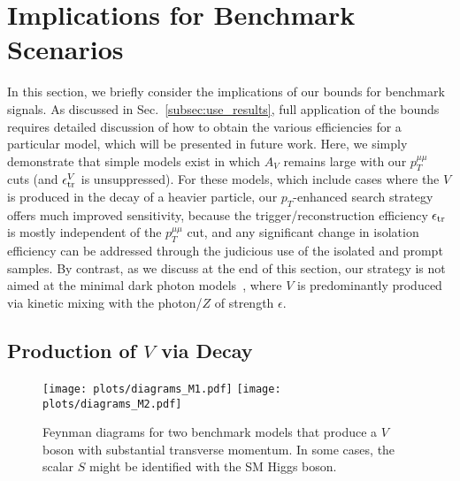 \documentclass[aps,prd,twocolumn,superscriptaddress,preprintnumbers,nofootinbib,longbibliography,floatfix]{revtex4-1}
\newcommand{\nameofsearch}{$p_T$-enhanced }
\newcommand{\ptmm}{p_T^{\mu\mu}}
\DeclareRobustCommand{\Sec}[1]{Sec.~\ref{#1}}
\begin{document}
\section{Implications for Benchmark Scenarios}
\label{sec:app}





In this section, we briefly consider the implications of our bounds for benchmark signals.  
%
As discussed in \Sec{subsec:use_results}, full application of the bounds requires detailed discussion of how to obtain the various efficiencies for a particular model, which will be presented in future work.
%
Here, we simply demonstrate that simple models exist in which $A_V$ remains large with our $\ptmm$ cuts (and $\epsilon^V_{\rm tr}$ is unsuppressed).
%
For these models, which include cases where the $V$ is produced in the decay of a heavier particle,
our \nameofsearch search strategy offers much improved sensitivity, because the trigger/reconstruction efficiency $\epsilon_{\rm tr}$ is mostly independent of the $\ptmm$ cut, and any significant change in isolation efficiency can be addressed through the judicious use of the isolated and prompt samples.
%
By contrast, as we discuss at the end of this section, our strategy is not aimed at the minimal dark photon models~\cite{Okun:1982xi,Galison:1983pa,Holdom:1985ag,Pospelov:2007mp,ArkaniHamed:2008qn,Bjorken:2009mm}, where $V$ is predominantly produced via kinetic mixing with the photon/$Z$ of strength $\epsilon$. 


\subsection{Production of $V$ via Decay}
\label{subsec:viadecay}

\begin{figure}[t]  
\begin{center}  
\texttt{[image: plots/diagrams\_M1.pdf]}
\texttt{[image: plots/diagrams\_M2.pdf]} 
\end{center}
\caption{Feynman diagrams for two benchmark models that produce a $V$ boson with substantial transverse momentum.  In some cases, the scalar $S$ might be identified with the SM Higgs boson.}
\label{fig:diagrams}
\end{figure}
\end{document}
